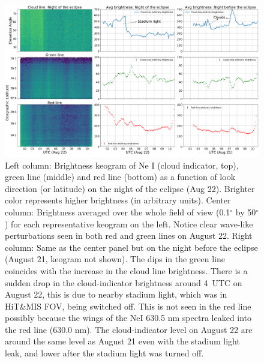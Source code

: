 \documentclass[crop=false,class=mitthesis,oneside,font=12pt]{standalone}
\begin{document}
\begin{figure}[H]
 \centering\includegraphics[width=35pc]{car_Aug2122_both.png}
 \caption{Left column: Brightness keogram of Ne I (cloud indicator, top), green line (middle) and red line (bottom) as a function of look direction (or latitude) on the night of the eclipse (Aug 22). Brighter color represents higher brightness (in arbitrary units).  
Center column: Brightness averaged over the whole field of view (0.1$^\circ$ by 50$^\circ$) for each representative keogram on the left. Notice clear wave-like perturbations seen in both red and green lines on August 22. Right column:  Same as the center panel but on the night before the eclipse (August 21, keogram not shown). The dips in the green line coincides with the increase in the cloud line brightness. There is a sudden drop in the cloud-indicator brightness around 4~UTC on August 22, this is due to nearby stadium light, which was in HiT\&MIS FOV, being switched off. This is not seen in the red line possibly because the wings of the NeI 630.5 nm spectra leaked into the red line (630.0 nm).  The cloud-indicator level on August 22 are around the same level as August 21 even with the stadium light leak, and lower after the stadium light was turned off. }
\label{fig:keo_profile}
\end{figure}
\end{document}

